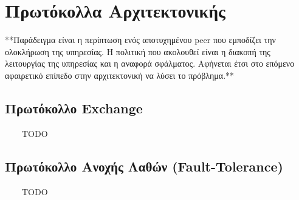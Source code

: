 \chapter{Πρωτόκολλα Αρχιτεκτονικής}
\label{chap:Protocols}

**Παράδειγμα είναι η περίπτωση ενός αποτυχημένου peer που εμποδίζει την 
ολοκλήρωση της υπηρεσίας. Η πολιτική που ακολουθεί είναι η διακοπή της 
λειτουργίας της υπηρεσίας και η αναφορά σφάλματος. Αφήνεται έτσι στο 
επόμενο αφαιρετικό επίπεδο στην αρχιτεκτονική να λύσει το πρόβλημα.**

\section{Πρωτόκολλο Exchange}

\ \ \ \ TODO

\section{Πρωτόκολλο Ανοχής Λαθών (Fault-Tolerance)}

\ \ \ \ TODO
